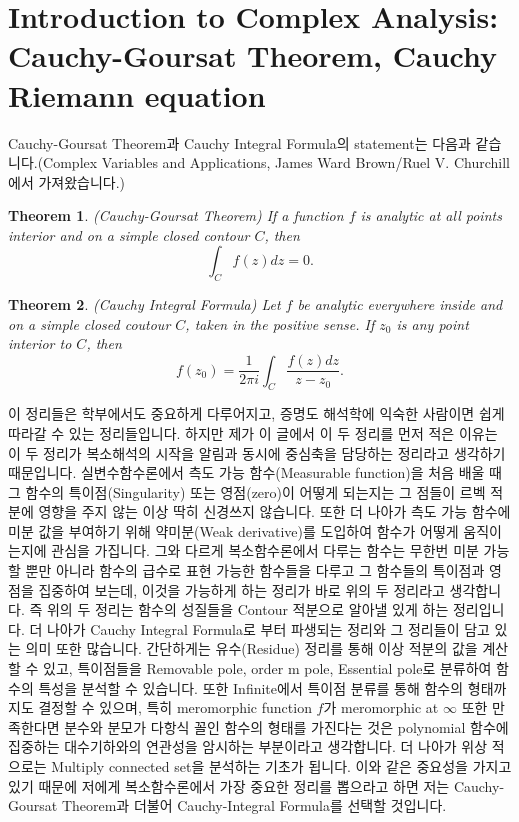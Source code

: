 \documentclass{article}
\newtheorem{theorem}{Theorem}
\begin{document}
\section{Introduction to Complex Analysis: Cauchy-Goursat Theorem, Cauchy Riemann equation}
Cauchy-Goursat Theorem과 Cauchy Integral Formula의 statement는 다음과 같습니다.(Complex Variables and Applications, James Ward Brown/Ruel V. Churchill에서 가져왔습니다.)
\begin{theorem}
(Cauchy-Goursat Theorem) If a function $f$ is analytic at all points interior and on a simple closed contour $C$, then
\begin{equation*}
\int_C f(z) dz=0.
\end{equation*}
\end{theorem}
\begin{theorem}
(Cauchy Integral Formula) Let $f$ be analytic everywhere inside and on a simple closed coutour $C$, taken in the positive sense. If $z_0$ is any point interior to $C$, then
\begin{equation*}
f(z_0)=\frac{1}{2\pi i }\int_C \frac{f(z)dz}{z-z_0}.
\end{equation*}
\end{theorem}
이 정리들은 학부에서도 중요하게 다루어지고, 증명도 해석학에 익숙한 사람이면 쉽게 따라갈 수 있는 정리들입니다. 하지만 제가 이 글에서 이 두 정리를 먼저 적은 이유는 이 두 정리가 복소해석의 시작을 알림과 동시에 중심축을 담당하는 정리라고 생각하기 때문입니다. 실변수함수론에서 측도 가능 함수(Measurable function)을 처음 배울 때 그 함수의 특이점(Singularity) 또는 영점(zero)이 어떻게 되는지는 그 점들이 르벡 적분에 영향을 주지 않는 이상 딱히 신경쓰지 않습니다. 또한 더 나아가 측도 가능 함수에 미분 값을 부여하기 위해 약미분(Weak derivative)를 도입하여 함수가 어떻게 움직이는지에 관심을 가집니다. 그와 다르게 복소함수론에서 다루는 함수는 무한번 미분 가능할 뿐만 아니라 함수의 급수로 표현 가능한 함수들을 다루고 그 함수들의 특이점과 영점을 집중하여 보는데, 이것을 가능하게 하는 정리가 바로 위의 두 정리라고 생각합니다. 즉 위의 두 정리는 함수의 성질들을 Contour 적분으로 알아낼 있게 하는 정리입니다. 더 나아가 Cauchy Integral Formula로 부터 파생되는 정리와 그 정리들이 담고 있는 의미 또한 많습니다. 간단하게는 유수(Residue) 정리를 통해 이상 적분의 값을 계산할 수 있고, 특이점들을 Removable pole, order m pole, Essential pole로 분류하여 함수의 특성을 분석할 수 있습니다. 또한 Infinite에서 특이점 분류를 통해 함수의 형태까지도 결정할 수 있으며, 특히 meromorphic function $f$가 meromorphic at $\infty$ 또한 만족한다면 분수와 분모가 다항식 꼴인 함수의 형태를 가진다는 것은 polynomial 함수에 집중하는 대수기하와의 연관성을 암시하는 부분이라고 생각합니다. 더 나아가 위상 적으로는 Multiply connected set을 분석하는 기초가 됩니다. 이와 같은 중요성을 가지고 있기 때문에 저에게 복소함수론에서 가장 중요한 정리를 뽑으라고 하면 저는 Cauchy-Goursat Theorem과 더불어 Cauchy-Integral Formula를 선택할 것입니다.
\end{document}
